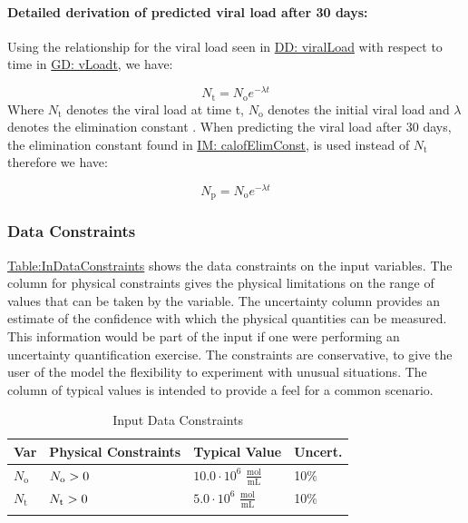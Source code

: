 \documentclass[12pt]{article}
\newcommand{\gt}{\ensuremath >}
\begin{document}
\paragraph{Detailed derivation of predicted viral load after 30 days:}
\label{IM:calofPredictedVLDeriv}
Using the relationship for the viral load seen in \hyperref[DD:viralLoad]{DD: viralLoad} with respect to time in \hyperref[GD:vLoadt]{GD: vLoadt}, we have:

\begin{displaymath}
{N_{\text{t}}}={N_{\text{o}}} e^{-λ t}
\end{displaymath}
Where ${N_{\text{t}}}$ denotes the viral load at time t, ${N_{\text{o}}}$ denotes the initial viral load and $λ$ denotes the elimination constant . When predicting the viral load after 30 days, the elimination constant  found in \hyperref[IM:calofElimConst]{IM: calofElimConst},  is used instead of ${N_{\text{t}}}$  therefore we have:

\begin{displaymath}
{N_{\text{p}}}={N_{\text{o}}} e^{-λ t}
\end{displaymath}
\subsubsection{Data Constraints}
\label{Sec:DataConstraints}
\hyperref[Table:InDataConstraints]{Table:InDataConstraints} shows the data constraints on the input variables. The column for physical constraints gives the physical limitations on the range of values that can be taken by the variable. The uncertainty column provides an estimate of the confidence with which the physical quantities can be measured. This information would be part of the input if one were performing an uncertainty quantification exercise. The constraints are conservative, to give the user of the model the flexibility to experiment with unusual situations. The column of typical values is intended to provide a feel for a common scenario.

\begin{longtable}{l l l l}
\toprule
\textbf{Var} & \textbf{Physical Constraints} & \textbf{Typical Value} & \textbf{Uncert.}
\\
\midrule
\endhead
${N_{\text{o}}}$ & ${N_{\text{o}}}\gt{}0$ & $10.0\cdot{}10^{6}$ $\frac{\text{mol}}{\text{mL}}$ & 10$\%$
\\
${N_{\text{t}}}$ & ${N_{\text{t}}}\gt{}0$ & $5.0\cdot{}10^{6}$ $\frac{\text{mol}}{\text{mL}}$ & 10$\%$
\\
\bottomrule
\caption{Input Data Constraints}
\label{Table:InDataConstraints}
\end{longtable}
\end{document}

